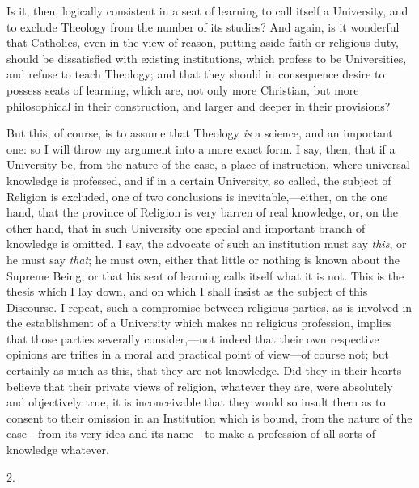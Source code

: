 Is it, then, logically consistent in a seat of learning to call
itself a University, and to exclude Theology from the number of its
studies? And again, is it wonderful that Catholics, even in the view
of reason, putting aside faith or religious duty, should be
dissatisfied with existing institutions, which profess to be
Universities, and refuse to teach Theology; and that they should in
consequence desire to possess seats of learning, which are, not only
more Christian, but more philosophical in their construction, and
larger and deeper in their provisions?

But this, of course, is to assume that Theology \emph{is} a
science, and an important one: so I will throw my argument into a more
exact form. I say, then, that if a University be, from the nature of
the case, a place of instruction, where universal knowledge is
professed, and if in a certain University, so called, the subject of
Religion is excluded, one of two conclusions is inevitable,—either,
on the one hand, that the province of Religion is very barren of real
knowledge, or, on the other hand, that in such University one special
and important branch of knowledge is omitted. I say, the advocate of
such an institution must say \emph{this}, or he must say \emph{that};
he must own, either that little or nothing is known about the Supreme
Being, or that his seat of learning calls itself what it is not. This
is the thesis which I lay down, and on which I shall insist as the
subject of this Discourse. I repeat, such a compromise between
religious parties, as is involved in the establishment of a University
which makes no religious profession, implies that those parties
severally consider,—not indeed that their own respective opinions
are trifles in a moral and practical point of view—of course
not; but certainly as much as this, that they are not knowledge. Did
they in their hearts believe that their private views of religion,
whatever they are, were absolutely and objectively true, it is
inconceivable that they would so insult them as to consent to their
omission in an Institution which is bound, from the nature of the case—from
its very idea and its name—to make a profession of all sorts of
knowledge whatever.

2.

